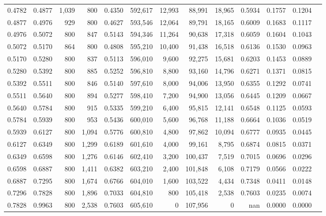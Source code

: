 \begin{tabular}{rrrrrrrrrrrrr}
0.4782 & 0.4877 &  1,039 &   800 &                                     0.4350 & 592,617 &  12,993 &  88,991 &  18,965 & 0.5934 & 0.1757 & 0.1204 \\
0.4877 & 0.4976 &    929 &   800 &                                     0.4627 & 593,546 &  12,064 &  89,791 &  18,165 & 0.6009 & 0.1683 & 0.1117 \\
0.4976 & 0.5072 &    800 &   847 &                                     0.5143 & 594,346 &  11,264 &  90,638 &  17,318 & 0.6059 & 0.1604 & 0.1043 \\
0.5072 & 0.5170 &    864 &   800 &                                     0.4808 & 595,210 &  10,400 &  91,438 &  16,518 & 0.6136 & 0.1530 & 0.0963 \\
0.5170 & 0.5280 &    800 &   837 &                                     0.5113 & 596,010 &   9,600 &  92,275 &  15,681 & 0.6203 & 0.1453 & 0.0889 \\
0.5280 & 0.5392 &    800 &   885 &                                     0.5252 & 596,810 &   8,800 &  93,160 &  14,796 & 0.6271 & 0.1371 & 0.0815 \\
0.5392 & 0.5511 &    800 &   846 &                                     0.5140 & 597,610 &   8,000 &  94,006 &  13,950 & 0.6355 & 0.1292 & 0.0741 \\
0.5511 & 0.5640 &    800 &   894 &                                     0.5277 & 598,410 &   7,200 &  94,900 &  13,056 & 0.6445 & 0.1209 & 0.0667 \\
0.5640 & 0.5784 &    800 &   915 &                                     0.5335 & 599,210 &   6,400 &  95,815 &  12,141 & 0.6548 & 0.1125 & 0.0593 \\
0.5784 & 0.5939 &    800 &   953 &                                     0.5436 & 600,010 &   5,600 &  96,768 &  11,188 & 0.6664 & 0.1036 & 0.0519 \\
0.5939 & 0.6127 &    800 & 1,094 &                                     0.5776 & 600,810 &   4,800 &  97,862 &  10,094 & 0.6777 & 0.0935 & 0.0445 \\
0.6127 & 0.6349 &    800 & 1,299 &                                     0.6189 & 601,610 &   4,000 &  99,161 &   8,795 & 0.6874 & 0.0815 & 0.0371 \\
0.6349 & 0.6598 &    800 & 1,276 &                                     0.6146 & 602,410 &   3,200 & 100,437 &   7,519 & 0.7015 & 0.0696 & 0.0296 \\
0.6598 & 0.6887 &    800 & 1,411 &                                     0.6382 & 603,210 &   2,400 & 101,848 &   6,108 & 0.7179 & 0.0566 & 0.0222 \\
0.6887 & 0.7295 &    800 & 1,674 &                                     0.6766 & 604,010 &   1,600 & 103,522 &   4,434 & 0.7348 & 0.0411 & 0.0148 \\
0.7296 & 0.7828 &    800 & 1,896 &                                     0.7033 & 604,810 &     800 & 105,418 &   2,538 & 0.7603 & 0.0235 & 0.0074 \\
0.7828 & 0.9963 &    800 & 2,538 &                                     0.7603 & 605,610 &       0 & 107,956 &       0 &    nan & 0.0000 & 0.0000 \\
\bottomrule
\end{tabular}
